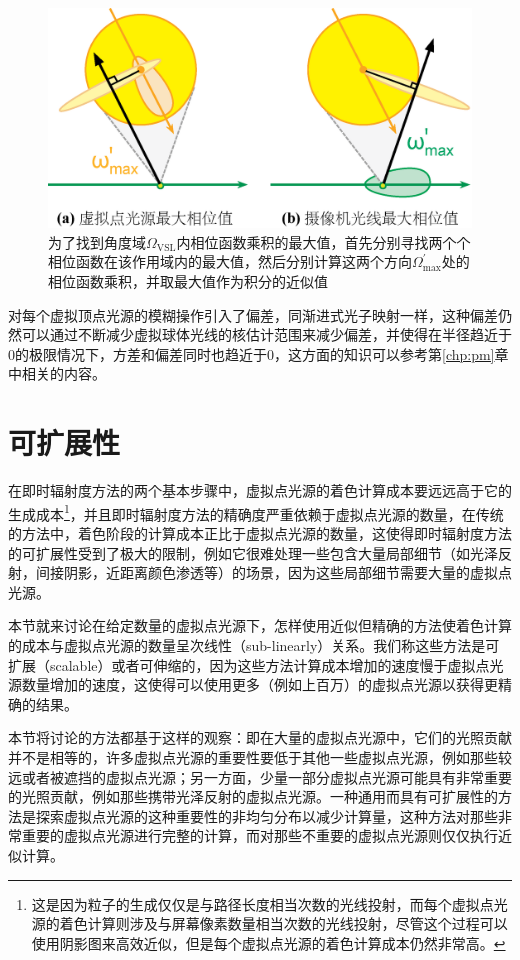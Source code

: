 \begin{figure}
	\sidecaption
	\includegraphics[width=.65\textwidth]{figures/ir/vbl-sampling}
	\caption{为了找到角度域$\Omega_{\text{VSL}}$内相位函数乘积的最大值，首先分别寻找两个个相位函数在该作用域内的最大值，然后分别计算这两个方向$\Omega^{'}_{\max}$处的相位函数乘积，并取最大值作为积分的近似值}
	\label{f:ir-vbl-sampling}
\end{figure}

对每个虚拟顶点光源的模糊操作引入了偏差，同渐进式光子映射一样，这种偏差仍然可以通过不断减少虚拟球体光线的核估计范围来减少偏差，并使得在半径趋近于0的极限情况下，方差和偏差同时也趋近于0，这方面的知识可以参考第\ref{chp:pm}章中相关的内容。




\section{可扩展性}
在即时辐射度方法的两个基本步骤中，虚拟点光源的着色计算成本要远远高于它的生成成本\footnote{这是因为粒子的生成仅仅是与路径长度相当次数的光线投射，而每个虚拟点光源的着色计算则涉及与屏幕像素数量相当次数的光线投射，尽管这个过程可以使用阴影图来高效近似，但是每个虚拟点光源的着色计算成本仍然非常高。}，并且即时辐射度方法的精确度严重依赖于虚拟点光源的数量，在传统的方法中，着色阶段的计算成本正比于虚拟点光源的数量，这使得即时辐射度方法的可扩展性受到了极大的限制，例如它很难处理一些包含大量局部细节（如光泽反射，间接阴影，近距离颜色渗透等）的场景，因为这些局部细节需要大量的虚拟点光源。

本节就来讨论在给定数量的虚拟点光源下，怎样使用近似但精确的方法使着色计算的成本与虚拟点光源的数量呈次线性（sub-linearly）关系。我们称这些方法是可扩展（scalable）或者可伸缩的，因为这些方法计算成本增加的速度慢于虚拟点光源数量增加的速度，这使得可以使用更多（例如上百万）的虚拟点光源以获得更精确的结果。

本节将讨论的方法都基于这样的观察：即在大量的虚拟点光源中，它们的光照贡献并不是相等的，许多虚拟点光源的重要性要低于其他一些虚拟点光源，例如那些较远或者被遮挡的虚拟点光源；另一方面，少量一部分虚拟点光源可能具有非常重要的光照贡献，例如那些携带光泽反射的虚拟点光源。一种通用而具有可扩展性的方法是探索虚拟点光源的这种重要性的非均匀分布以减少计算量，这种方法对那些非常重要的虚拟点光源进行完整的计算，而对那些不重要的虚拟点光源则仅仅执行近似计算。

